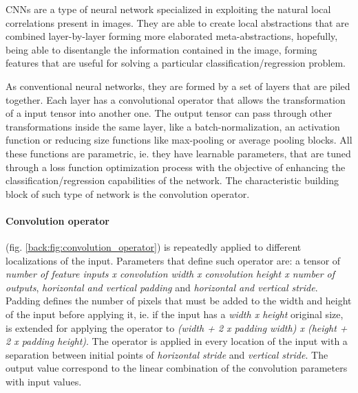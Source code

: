 CNNs are a type of neural network specialized in exploiting the natural local correlations present in images. They are able to create local abstractions that are combined layer-by-layer forming more elaborated meta-abstractions, hopefully, being able to disentangle the information contained in the image, forming features that are useful for solving a particular classification/regression problem. 

As conventional neural networks, they are formed by a set of layers that are piled together. Each layer has a convolutional operator that allows the transformation of a input tensor into another one. The output tensor can pass through other transformations inside the same layer, like a batch-normalization, an activation function or reducing size functions like max-pooling or average pooling blocks. All these functions are parametric, ie. they have learnable parameters, that are tuned through a loss function optimization process with the objective of enhancing the classification/regression capabilities of the network. The characteristic building block of such type of network is the convolution operator.

\paragraph{Convolution operator} (fig. \ref{back:fig:convolution_operator}) is repeatedly applied to different localizations of the input. Parameters that define such operator are: a tensor of \emph{number of feature inputs x convolution width x convolution height x number of outputs}, \emph{horizontal and vertical padding} and \emph{horizontal and vertical stride}. Padding defines the number of pixels that must be added to the width and height of the input before applying it, ie. if the input has a \emph{width x height} original size, is extended for applying the operator to \emph{(width + 2 x padding width) x (height + 2 x padding height)}. The operator is applied in every location of the input with a separation between initial points of \emph{horizontal stride} and \emph{vertical stride}. The output value correspond to the linear combination of the convolution parameters with input values.

